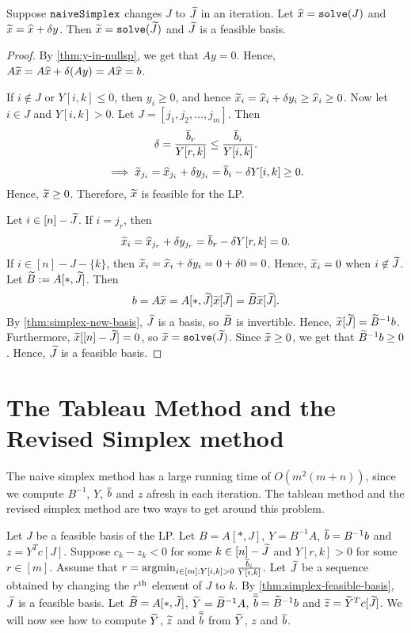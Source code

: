 \begin{lemma}
\label{thm:simplex-feasible-basis}
Suppose $\operatorname{\mathtt{naiveSimplex}}$ changes $J$ to $\widetilde{J}$ in an iteration.
Let $\widehat{x} = \operatorname{\mathtt{solve}}(J)$ and $\widetilde{x} = \widehat{x} + \delta y$.
Then $\widetilde{x} = \operatorname{\mathtt{solve}}(\widetilde{J})$ and $\widetilde{J}$ is a feasible basis.
\end{lemma}
\begin{proof}
By \cref{thm:y-in-nullsp}, we get that $Ay = 0$.
Hence, $A\widetilde{x} = A\widehat{x} + \delta (Ay) = A\widehat{x} = b$.

If $i \not\in J$ or $Y[i, k] \le 0$, then $y_i \ge 0$,
and hence $\widetilde{x}_i = \widehat{x}_i + \delta y_i \ge \widehat{x}_i \ge 0$.
Now let $i \in J$ and $Y[i,k] > 0$.
Let $J = [j_1, j_2, \ldots, j_m]$. Then
\[ \delta = \frac{\overline{b}_r}{Y[r,k]} \le \frac{\overline{b}_i}{Y[i, k]}. \]
\[ \implies \widetilde{x}_{j_i} = \widehat{x}_{j_i} + \delta y_{j_i} = \overline{b}_i - \delta Y[i,k] \ge 0. \]
Hence, $\widetilde{x} \ge 0$. Therefore, $\widetilde{x}$ is feasible for the LP.

Let $i \in [n] - \widetilde{J}$. If $i = j_r$, then
\[ \widetilde{x}_i = \widehat{x}_{j_r} + \delta y_{j_r} = \overline{b}_r - \delta Y[r,k] = 0. \]
If $i \in [n] - J - \{k\}$, then $\widetilde{x}_i = \widehat{x}_i + \delta y_i = 0 + \delta 0 = 0$.
Hence, $\widetilde{x}_i = 0$ when $i \not\in \widetilde{J}$.
Let $\widetilde{B} := A[*,\widetilde{J}]$. Then
\[ b = A\widetilde{x} = A[*,\widetilde{J}]\widetilde{x}[\widetilde{J}] = \widetilde{B}\widetilde{x}[\widetilde{J}]. \]
By \cref{thm:simplex-new-basis}, $\widetilde{J}$ is a basis, so $\widetilde{B}$ is invertible.
Hence, $\widetilde{x}[\widetilde{J}] = \widetilde{B}^{-1}b$.
Furthermore, $\widetilde{x}[[n] - \widetilde{J}] = 0$, so $\widetilde{x} = \operatorname{\mathtt{solve}}(\widetilde{J})$.
Since $\widetilde{x} \ge 0$, we get that $\widetilde{B}^{-1}b \ge 0$.
Hence, $\widetilde{J}$ is a feasible basis.
\end{proof}

\section{The Tableau Method and the Revised Simplex method}

The naive simplex method has a large running time of $O(m^2(m + n))$,
since we compute $B^{-1}$, $Y$, $\overline{b}$ and $z$ afresh in each iteration.
The tableau method and the revised simplex method are two ways to get around this problem.

Let $J$ be a feasible basis of the LP.
Let $B = A[*,J]$, $Y = B^{-1}A$, $\overline{b} = B^{-1}b$ and $z = Y^Tc[J]$.
Suppose $c_k - z_k < 0$ for some $k \in [n] - \widetilde{J}$ and $Y[r,k] > 0$ for some $r \in [m]$.
Assume \wLoG{} that $r = \operatorname*{argmin}_{i \in [m]: Y[i,k] > 0} \frac{\overline{b}_i}{Y[i,k]}$.
Let $\widetilde{J}$ be a sequence obtained by changing the $r^{\textrm{th}}$ element of $J$ to $k$.
By \cref{thm:simplex-feasible-basis}, $\widetilde{J}$ is a feasible basis.
Let $\widetilde{B} = A[*,\widetilde{J}]$, $\widetilde{Y} = \widetilde{B}^{-1}A$, $\overline{\widetilde{b}} = \widetilde{B}^{-1}b$
and $\widetilde{z} = \widetilde{Y}^Tc[\widetilde{J}]$.
We will now see how to compute $\widetilde{Y}$, $\widetilde{z}$ and $\overline{\widetilde{b}}$
from $\widetilde{Y}$, $z$ and $\overline{b}$.


